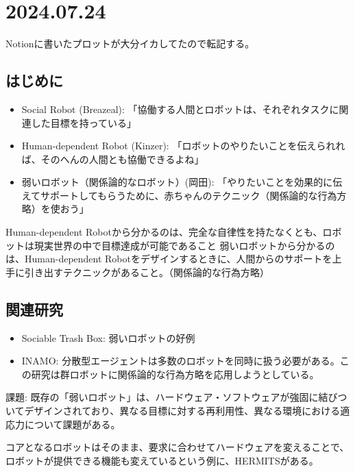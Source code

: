 \documentclass[fleqn,twocolumn]{mynote}
\begin{document}
\section{2024.07.24}

Notionに書いたプロットが大分イカしてたので転記する。

\subsection{はじめに}
\begin{itemize}
  \item Social Robot (Breazeal)\cite{Breazeal-2004-SocialInteractionsHRIRobot}: 「協働する人間とロボットは、それぞれタスクに関連した目標を持っている」
  \item Human-dependent Robot (Kinzer)\cite{--TweenbotsKacieKinzer}: 「ロボットのやりたいことを伝えられれば、そのへんの人間とも協働できるよね」
  \item 弱いロボット（関係論的なロボット）(岡田)\cite{岡田美智男-2012-ゴミ箱ロ}: 「やりたいことを効果的に伝えてサポートしてもらうために、赤ちゃんのテクニック（関係論的な行為方略）を使おう」
\end{itemize}
Human-dependent Robotから分かるのは、完全な自律性を持たなくとも、ロボットは現実世界の中で目標達成が可能であること
弱いロボットから分かるのは、Human-dependent Robotをデザインするときに、人間からのサポートを上手に引き出すテクニックがあること。（関係論的な行為方略）

\subsection{関連研究}
\begin{itemize}
  \item Sociable Trash Box\cite{Yamaji-2010-STBHumandependentSociableTrash}: 弱いロボットの好例
  \item INAMO\cite{岡田美智男-2012-ゴミ箱ロ}: 分散型エージェントは多数のロボットを同時に扱う必要がある。この研究は群ロボットに関係論的な行為方略を応用しようとしている。
\end{itemize}

課題: 既存の「弱いロボット」は、ハードウェア・ソフトウェアが強固に結びついてデザインされており、異なる目標に対する再利用性、異なる環境における適応力について課題がある。

コアとなるロボットはそのまま、要求に合わせてハードウェアを変えることで、ロボットが提供できる機能も変えているという例に、HERMITS\cite{Group-2020-HERMITS}がある。
\end{document}
